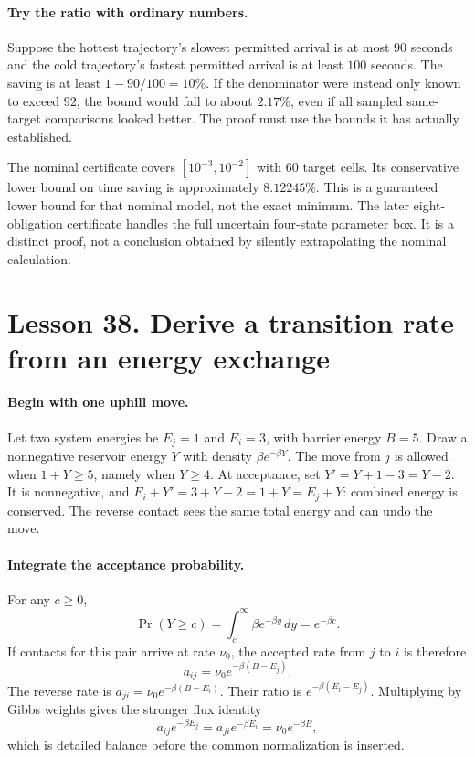 \paragraph{Try the ratio with ordinary numbers.}
Suppose the hottest trajectory's slowest permitted arrival is at most
$90$ seconds and the cold trajectory's fastest permitted arrival is at
least $100$ seconds. The saving is at least $1-90/100=10\%$.
If the denominator were instead only known to exceed $92$, the bound would
fall to about $2.17\%$, even if all sampled same-target comparisons looked
better. The proof must use the bounds it has actually established.

The nominal certificate covers $[10^{-3},10^{-2}]$ with 60 target cells.
Its conservative lower bound on time saving is approximately $8.12245\%$.
This is a guaranteed lower bound for that nominal model, not the exact
minimum. The later eight-obligation certificate handles the full uncertain
four-state parameter box. It is a distinct proof, not a conclusion obtained
by silently extrapolating the nominal calculation.

\section*{Lesson 38. Derive a transition rate from an energy exchange}
\paragraph{Begin with one uphill move.}
Let two system energies be $E_j=1$ and $E_i=3$, with barrier energy $B=5$.
Draw a nonnegative reservoir energy $Y$ with density $\beta e^{-\beta Y}$.
The move from $j$ is allowed when $1+Y\geq5$, namely when $Y\geq4$.
At acceptance, set $Y'=Y+1-3=Y-2$. It is nonnegative, and
$E_i+Y'=3+Y-2=1+Y=E_j+Y$: combined energy is conserved.
The reverse contact sees the same total energy and can undo the move.

\paragraph{Integrate the acceptance probability.}
For any $c\geq0$,
\[
 \Pr(Y\geq c)=\int_c^\infty\beta e^{-\beta y}\,dy=e^{-\beta c}.
\]
If contacts for this pair arrive at rate $\nu_0$, the accepted rate from
$j$ to $i$ is therefore
\[
 a_{ij}=\nu_0e^{-\beta(B-E_j)}.
\]
The reverse rate is $a_{ji}=\nu_0e^{-\beta(B-E_i)}$.
Their ratio is $e^{-\beta(E_i-E_j)}$. Multiplying by Gibbs weights
gives the stronger flux identity
\[
 a_{ij}e^{-\beta E_j}=a_{ji}e^{-\beta E_i}
 =\nu_0e^{-\beta B},
\]
which is detailed balance before the common normalization is inserted.

